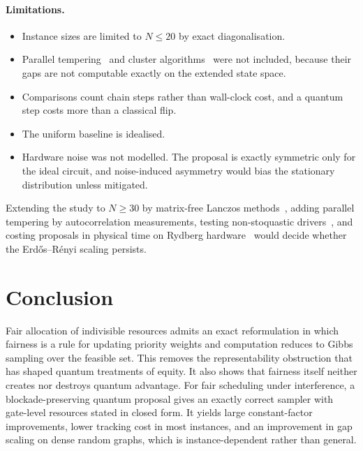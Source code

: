 \documentclass[11pt,a4paper]{article}
\begin{document}
\paragraph{Limitations.}
\begin{itemize}[leftmargin=*]
\item Instance sizes are limited to $N\le20$ by exact diagonalisation.
\item Parallel tempering~\cite{hukushima1996exchange} and cluster
algorithms~\cite{swendsen1987nonuniversal} were not included, because their gaps are not
computable exactly on the extended state space.
\item Comparisons count chain steps rather than wall-clock cost, and a quantum step costs more than a
classical flip.
\item The uniform baseline is idealised.
\item Hardware noise was not modelled. The proposal is exactly symmetric only for the ideal circuit,
and noise-induced asymmetry would bias the stationary distribution unless mitigated.
\end{itemize}
Extending the study to $N\ge30$ by matrix-free Lanczos methods~\cite{lanczos1950iteration},
adding parallel tempering by autocorrelation measurements, testing non-stoquastic
drivers~\cite{choi2026exponential}, and costing proposals in physical time on Rydberg
hardware~\cite{ebadi2022quantum} would decide whether the Erd\H{o}s--R\'enyi scaling persists.

\section{Conclusion}

Fair allocation of indivisible resources admits an exact reformulation in which fairness is a rule
for updating priority weights and computation reduces to Gibbs sampling over the feasible set. This
removes the representability obstruction that has shaped quantum treatments of equity. It also
shows that fairness itself neither creates nor destroys quantum advantage. For fair scheduling under
interference, a blockade-preserving quantum proposal gives an exactly correct sampler with
gate-level resources stated in closed form. It yields large constant-factor improvements, lower
tracking cost in most instances, and an improvement in gap scaling on dense random graphs, which is
instance-dependent rather than general.
\end{document}
